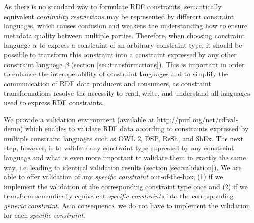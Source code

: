 \documentclass{llncs}
\newcommand{\ms}[1]{\texttt{#1}}
\begin{document}
As there is no standard way to formulate RDF constraints, 
semantically equivalent \emph{cardinality restrictions} may be represented by different constraint languages, which causes confusion and weakens the understanding how to ensure metadata quality between multiple parties. 
Therefore, when choosing constraint language \ms{$\alpha$} to express a constraint of an arbitrary constraint type, it should be possible to transform this constraint into a constraint expressed by any other constraint language \ms{$\beta$} (section \ref{sec:transformations}). 
This is important in order to enhance the interoperability of constraint languages and to simplify the communication of RDF data producers and consumers, 
as constraint transformations resolve the necessity to read, write, and understand all languages used to express RDF constraints.

We provide a validation environment (available at \url{http://purl.org/net/rdfval-demo}) which enables to validate RDF data according to constraints expressed by multiple  constraint languages such as OWL 2, DSP, ReSh, and ShEx.
The next step, however, is to validate any constraint type expressed by any constraint language and 
what is even more important to validate them in exactly the same way, i.e. leading to identical validation results (section \ref{sec:validation}). 
We are able to offer validation of any \emph{specific constraint} out-of-the-box, (1) if we implement the validation of the corresponding constraint type once and (2) if we transform semantically equivalent \emph{specific constraints} into the corresponding \emph{generic constraint}. 
As a consequence, we do not have to implement the validation for each \emph{specific constraint}. 



\end{document}
